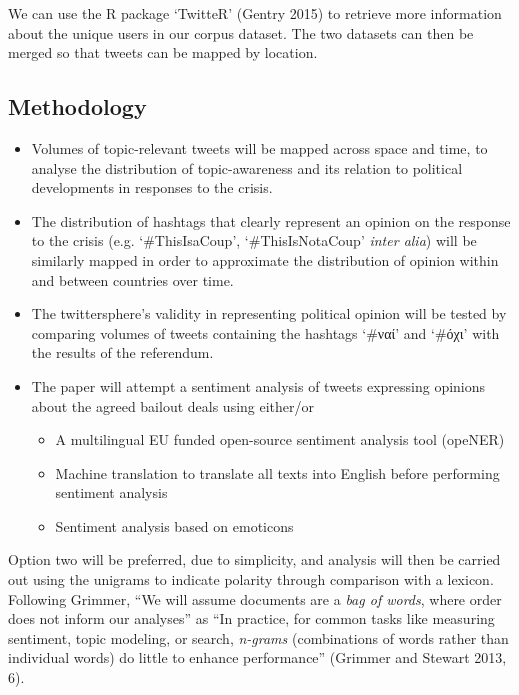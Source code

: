 \documentclass[]{article}
\begin{document}
We can use the R package `TwitteR' (Gentry 2015) to retrieve more
information about the unique users in our corpus dataset. The two
datasets can then be merged so that tweets can be mapped by location.

\subsection{Methodology}\label{methodology}

\begin{itemize}
\item
  Volumes of topic-relevant tweets will be mapped across space and time,
  to analyse the distribution of topic-awareness and its relation to
  political developments in responses to the crisis.
\item
  The distribution of hashtags that clearly represent an opinion on the
  response to the crisis (e.g. `\#ThisIsaCoup', `\#ThisIsNotaCoup'
  \emph{inter alia}) will be similarly mapped in order to approximate
  the distribution of opinion within and between countries over time.
\item
  The twittersphere's validity in representing political opinion will be
  tested by comparing volumes of tweets containing the hashtags `\#ναί'
  and `\#όχι' with the results of the referendum.
\item
  The paper will attempt a sentiment analysis of tweets expressing
  opinions about the agreed bailout deals using either/or

  \begin{itemize}
  \item
    A multilingual EU funded open-source sentiment analysis tool
    (opeNER)
  \item
    Machine translation to translate all texts into English before
    performing sentiment analysis
  \item
    Sentiment analysis based on emoticons
  \end{itemize}
\end{itemize}

Option two will be preferred, due to simplicity, and analysis will then
be carried out using the unigrams to indicate polarity through
comparison with a lexicon. Following Grimmer, ``We will assume documents
are a \emph{bag of words}, where order does not inform our analyses'' as
``In practice, for common tasks like measuring sentiment, topic
modeling, or search, \emph{n-grams} (combinations of words rather than
individual words) do little to enhance performance'' (Grimmer and
Stewart 2013, 6).
\end{document}
